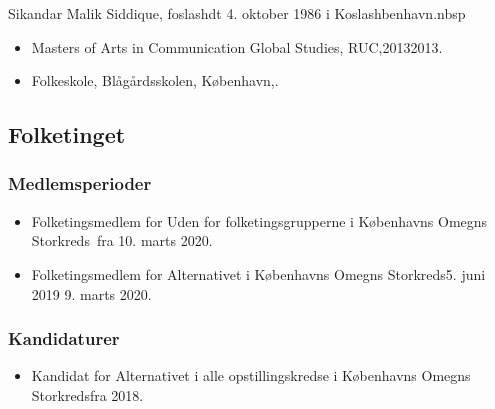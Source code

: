 \documentclass[11pt, a4paper]{awesome-cv}
\begin{document}
\makecvheader[R]
\makelettertitle
\begin{cvletter}
Sikandar Malik Siddique, foslashdt 4. oktober 1986 i Koslashbenhavn.nbsp

\begin{itemize}
\item Masters of Arts in Communication  Global Studies, RUC,20132013.
\item Folkeskole, Blågårdsskolen, København,.
\end{itemize}
\subsection*{Folketinget}
\subsubsection*{Medlemsperioder}
\begin{itemize}
\item Folketingsmedlem for Uden for folketingsgrupperne i Københavns Omegns Storkreds fra 10. marts 2020.
\item Folketingsmedlem for Alternativet i Københavns Omegns Storkreds5. juni 2019  9. marts 2020.
\end{itemize}
\subsubsection*{Kandidaturer}
\begin{itemize}
\item Kandidat for Alternativet i alle opstillingskredse i Københavns Omegns Storkredsfra 2018.
\end{itemize}
\end{cvletter}
\end{document}
